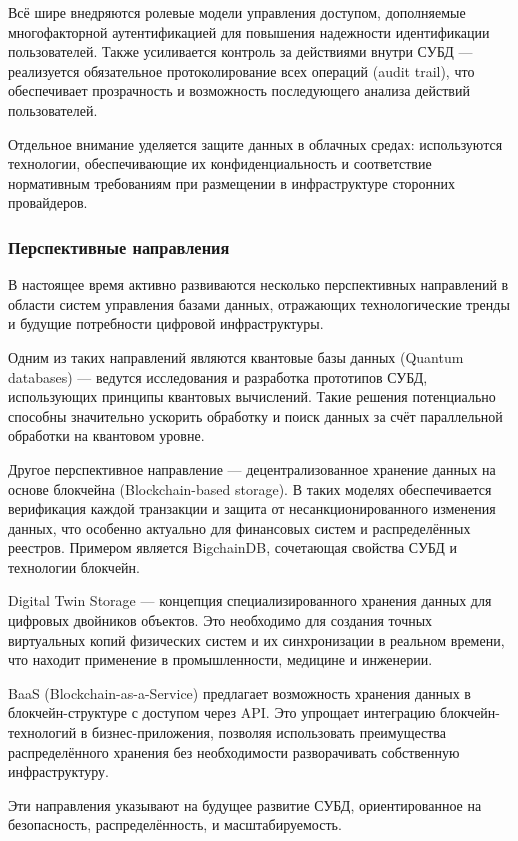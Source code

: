 Всё шире внедряются ролевые модели управления доступом, дополняемые многофакторной аутентификацией для повышения надежности идентификации пользователей. Также усиливается контроль за действиями внутри СУБД — реализуется обязательное протоколирование всех операций (audit trail), что обеспечивает прозрачность и возможность последующего анализа действий пользователей. 

Отдельное внимание уделяется защите данных в облачных средах: используются технологии, обеспечивающие их конфиденциальность и соответствие нормативным требованиям при размещении в инфраструктуре сторонних провайдеров.

\subsubsection{Перспективные направления}

В настоящее время активно развиваются несколько перспективных направлений в области систем управления базами данных, отражающих технологические тренды и будущие потребности цифровой инфраструктуры.

Одним из таких направлений являются квантовые базы данных (Quantum databases) — ведутся исследования и разработка прототипов СУБД, использующих принципы квантовых вычислений. Такие решения потенциально способны значительно ускорить обработку и поиск данных за счёт параллельной обработки на квантовом уровне.

Другое перспективное направление — децентрализованное хранение данных на основе блокчейна (Blockchain-based storage). В таких моделях обеспечивается верификация каждой транзакции и защита от несанкционированного изменения данных, что особенно актуально для финансовых систем и распределённых реестров. Примером является BigchainDB, сочетающая свойства СУБД и технологии блокчейн.

Digital Twin Storage — концепция специализированного хранения данных для цифровых двойников объектов. Это необходимо для создания точных виртуальных копий физических систем и их синхронизации в реальном времени, что находит применение в промышленности, медицине и инженерии.

BaaS (Blockchain-as-a-Service) предлагает возможность хранения данных в блокчейн-структуре с доступом через API. Это упрощает интеграцию блокчейн-технологий в бизнес-приложения, позволяя использовать преимущества распределённого хранения без необходимости разворачивать собственную инфраструктуру.

Эти направления указывают на будущее развитие СУБД, ориентированное на безопасность, распределённость, и масштабируемость.

